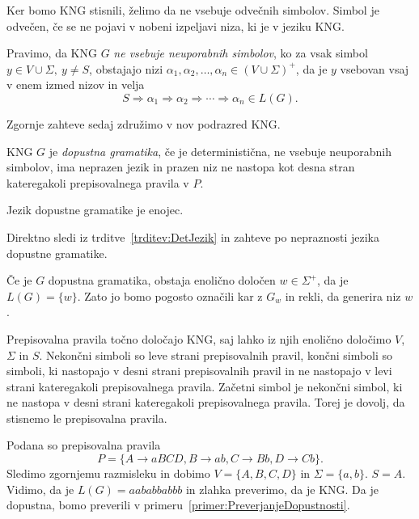 \documentclass[fin1, tisk]{fmfdelo}
\theoremstyle{definition}
\begin{document}
Ker bomo KNG stisnili, želimo da ne vsebuje odvečnih simbolov. Simbol je odvečen, če se
ne pojavi v nobeni izpeljavi niza, ki je v jeziku KNG.

\begin{definicija}
    Pravimo, da KNG $G$ \emph{ne vsebuje neuporabnih simbolov}, 
    ko za vsak simbol $ y \in V \cup \Sigma, \ y \neq S $, obstajajo nizi
    $ \alpha_1, \alpha_2, \ldots, \alpha_n \in (V \cup \Sigma)^+ $, da je $y$ vsebovan vsaj
    v enem izmed nizov in velja
    \[
        S \Rightarrow \alpha_1 \Rightarrow \alpha_2 \Rightarrow \cdots \Rightarrow \alpha_n \in L(G).
    \]
\end{definicija}

Zgornje zahteve sedaj združimo v nov podrazred KNG. 

\begin{definicija}
    KNG $G$ je \emph{dopustna gramatika}, če je deterministična, ne vsebuje neuporabnih simbolov,
    ima neprazen jezik in prazen niz ne nastopa kot desna stran kateregakoli prepisovalnega 
    pravila v $P$.
\end{definicija}

\begin{posledica}
    Jezik dopustne gramatike je enojec. 
\end{posledica}

\begin{dokaz}
    Direktno sledi iz trditve~\ref{trditev:DetJezik} in zahteve po nepraznosti jezika dopustne 
    gramatike.
\end{dokaz}

Če je $G$ dopustna gramatika, obstaja enolično določen $w \in \Sigma^+$, da je
$L(G) = \{ w \}$. Zato jo bomo pogosto označili kar z $G_w$ in rekli, da generira niz $w$.

Prepisovalna pravila točno določajo KNG, saj lahko iz njih enolično določimo $V$, $\Sigma$ in $S$.
Nekončni simboli so leve strani prepisovalnih pravil, končni simboli so simboli, ki nastopajo
v desni strani prepisovalnih pravil in ne nastopajo v levi strani kateregakoli prepisovalnega
pravila. Začetni simbol je nekončni simbol, ki ne nastopa v desni strani kateregakoli 
prepisovalnega pravila. Torej je dovolj, da stisnemo le prepisovalna pravila.

\begin{primer}\label{primer:dopustna}
    Podana so prepisovalna pravila
    \[
        P = \{ A \rightarrow \mathit{aBCD}, B \rightarrow \mathit{ab}, C \rightarrow 
        \mathit{Bb}, D \rightarrow \mathit{Cb} \}.
    \]
    Sledimo zgornjemu razmisleku in dobimo $V = \{ A, B, C, D \}$ in $\Sigma = \{ a, b \}$.
    $S = A$. Vidimo, da je $L(G) = \mathit{aababbabbb}$ in  zlahka preverimo, da je KNG. Da je dopustna,
    bomo preverili v primeru~\ref{primer:PreverjanjeDopustnosti}.
\end{primer}
\end{document}
